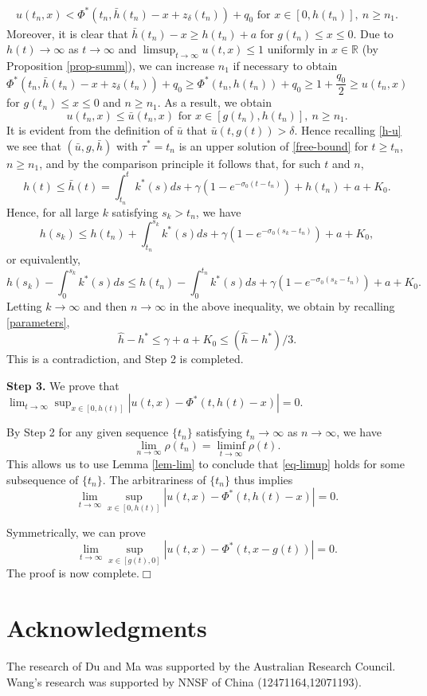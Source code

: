 \documentclass[11pt]{amsart}
\numberwithin{equation}{section}
\begin{document}
\begin{eqnarray*}
  u(t_n,x)< \Phi^*(t_n, \bar{h}(t_n)-x+z_\delta(t_n))+q_0 \text{ for }x\in[0,h(t_n)],\ n\geq n_1.
\end{eqnarray*}
Moreover, it is clear that  $\bar{h}(t_n)-x\geq h(t_n)+a$ for $g(t_n)\leq x\leq 0$. Due to $h(t)\to\infty$  as $t\to\infty$ and $\limsup_{t\to\infty}u(t,x)\leq 1$ uniformly in $x\in\mathbb{R}$  (by Proposition \ref{prop-summ}), we can increase $n_1$ if necessary to obtain 
\[ \Phi^*(t_{n},\bar{h}(t_{n})-x+z_\delta(t_{n}))+q_0\geq\Phi^*(t_{n},h(t_{n}))+q_0\geq  1+\frac{q_0}{2}\geq u(t_{n},x)\]
for $g(t_{n})\leq x\leq 0$ and $n\geq n_1$. 
As a result, we obtain 
$$u(t_{n},x)\leq \bar{u}(t_{n},x) \text{ for }x\in[g(t_n),h(t_n)],\ n\geq n_1.$$
It is evident from the definition of $\bar u$ that $\bar u(t, g(t))>\delta$. Hence recalling \eqref{h-u} we see that $(\bar{u},g, \bar{h})$ with $\tau^*=t_n$ is an upper solution of \eqref{free-bound} for  $t\geq t_{n}$, $n\geq n_1$, and by the comparison principle it follows that,  for such $t$ and $n$,
\[h(t)\leq \bar{h}(t)=\int_{t_{n}}^tk^*(s)ds+\gamma(1-e^{-\sigma_0(t-t_{n})})+h(t_{n})+a+K_0.\]
Hence, for all large $k$ satisfying $s_k>t_n$, we have
\[h(s_k)\leq h(t_{n})+\int^{s_k}_{t_{n}}k^*(s)ds+\gamma(1-e^{-\sigma_0(s_k-t_{n})})+a+K_0,\]
or equivalently,
\[h(s_k)-\int_0^{s_k}k^*(s)ds\leq h(t_{n})-\int_0^{t_{n}}k^*(s)ds+\gamma(1-e^{-\sigma_0(s_k-t_{n})})+a+K_0.\]
Letting $k\to\infty$ and then $n\to\infty$ in the above inequality, we obtain by recalling \eqref{parameters}, 
\[\hat{h}-h^*\leq \gamma+a+K_0\leq (\hat{h}-h^*)/3.\]
This is a contradiction, and Step 2 is completed.

\textbf{Step 3.}  We prove that $\lim_{t\to\infty} \sup_{x\in[0,h(t)]}|u(t,x)-\Phi^*(t,h(t)-x)|=0$.

By Step 2  for any given  sequence $\{t_n\}$ satisfying $t_n\to\infty$ as $n\to\infty$, we have
$$\lim_{n\to\infty}\rho(t_n)=\liminf_{t\to\infty}\rho(t).$$
This allows us to use Lemma \ref{lem-lim} to conclude that \eqref{eq-limup} holds for some subsequence of  $\{t_n\}$. The arbitrariness of  $\{t_n\}$ thus implies 
$$\lim_{t\to\infty} \sup_{x\in[0,h(t)]}|u(t,x)-\Phi^*(t,h(t)-x)|=0.$$

Symmetrically, we can prove 
 \begin{equation*}
  \lim_{t\to\infty}\sup_{x\in[g(t),0]}|u(t,x)-\Phi^*(t,x-g(t))|=0.
 \end{equation*}
 The proof   is now complete.\hfill $\Box$
\section*{Acknowledgments} The research of Du and Ma was supported by the Australian Research Council.   Wang's research was supported by NNSF of China (12471164,12071193).
\end{document}
